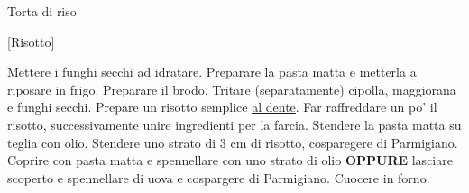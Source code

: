 \begin{recipe}{Torta di riso}
    \begin{header}
    
        [Risotto]
    \end{header}
    
    \begin{ingredients}
        
        
        
    \end{ingredients}
    
    \begin{preparation}
        \step Mettere i funghi secchi ad idratare.
        \step Preparare la pasta matta e metterla a riposare in frigo.
        \step Preparare il brodo.
        \step Tritare (separatamente) cipolla, maggiorana e funghi secchi.
        \step Prepare un risotto semplice \underline{al dente}.
        \step Far raffreddare un po' il risotto, successivamente unire ingredienti per la farcia.
        \step Stendere la pasta matta su teglia con olio.
        \step Stendere uno strato di 3 cm di risotto, cosparegere di Parmigiano.
        \step Coprire con pasta matta e spennellare con uno strato di olio \textbf{OPPURE} lasciare scoperto e spennellare di uova e cospargere di Parmigiano.
        \step Cuocere in forno.
    \end{preparation}
\end{recipe}

